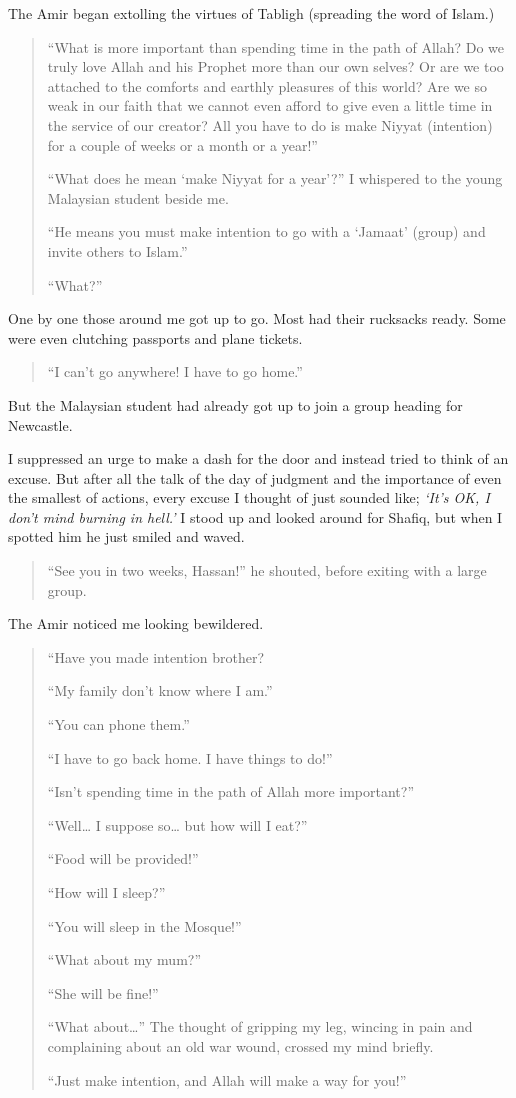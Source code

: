 \documentclass[12pt]{memoir}
\begin{document}
The Amir began extolling the virtues of Tabligh (spreading the word of Islam.)

\begin{quote}
“What is more important than spending time in the path of Allah?
Do we truly love Allah and his Prophet more than our own selves?
Or are we too attached to the comforts and earthly pleasures of this world?
Are we so weak in our faith that we cannot even afford to give
even a little time in the service of our creator?
All you have to do is make Niyyat (intention)
for a couple of weeks or a month or a year!”

“What does he mean ‘make Niyyat for a year’?”
I whispered to the young Malaysian student beside me.

“He means you must make intention to go with a ‘Jamaat’ (group)
and invite others to Islam.”

“What?”
\end{quote}

One by one those around me got up to go.
Most had their rucksacks ready.
Some were even clutching passports and plane tickets.

\begin{quote}
“I can’t go anywhere! I have to go home.”
\end{quote}

But the Malaysian student had already got up to join a group heading for Newcastle.

I suppressed an urge to make a dash for the door
and instead tried to think of an excuse.
But after all the talk of the day of judgment
and the importance of even the smallest of actions,
every excuse I thought of just sounded like;
\emph{‘It’s OK, I don’t mind burning in hell.’}
I stood up and looked around for Shafiq,
but when I spotted him he just smiled and waved.

\begin{quote}
“See you in two weeks, Hassan!” he shouted, before exiting with a large group.
\end{quote}

The Amir noticed me looking bewildered.

\begin{quote}
“Have you made intention brother?

“My family don’t know where I am.”

“You can phone them.”

“I have to go back home. I have things to do!”

“Isn’t spending time in the path of Allah more important?”

“Well… I suppose so… but how will I eat?”

“Food will be provided!”

“How will I sleep?”

“You will sleep in the Mosque!”

“What about my mum?”

“She will be fine!”

“What about…” The thought of gripping my leg,
wincing in pain and complaining about an old war wound,
crossed my mind briefly.

“Just make intention, and Allah will make a way for you!”
\end{quote}
\end{document}
